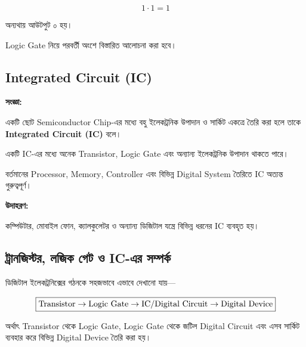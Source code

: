 \[
1\cdot1=1
\]

অন্যথায় আউটপুট ০ হয়।

\par\begingroup

\textenglish{Logic Gate} নিয়ে পরবর্তী অংশে বিস্তারিত আলোচনা করা হবে।
\par\endgroup



\subsection{\textenglish{Integrated Circuit (IC)}}

\par\begingroup

\textbf{সংজ্ঞা:}

একটি ছোট \textenglish{Semiconductor Chip}-এর মধ্যে
বহু ইলেকট্রনিক উপাদান ও সার্কিট একত্রে তৈরি করা হলে
তাকে \textbf{\textenglish{Integrated Circuit (IC)}} বলে।
\par\endgroup


একটি \textenglish{IC}-এর মধ্যে অনেক
\textenglish{Transistor}, \textenglish{Logic Gate}
এবং অন্যান্য ইলেকট্রনিক উপাদান থাকতে পারে।

বর্তমানের \textenglish{Processor}, \textenglish{Memory},
\textenglish{Controller} এবং বিভিন্ন
\textenglish{Digital System} তৈরিতে
\textenglish{IC} অত্যন্ত গুরুত্বপূর্ণ।

\textbf{\textcolor{ICTOrange}{উদাহরণ:}}

কম্পিউটার, মোবাইল ফোন, ক্যালকুলেটর ও অন্যান্য
ডিজিটাল যন্ত্রে বিভিন্ন ধরনের \textenglish{IC} ব্যবহৃত হয়।


\subsection{ট্রানজিস্টর, লজিক গেট ও \textenglish{IC}-এর সম্পর্ক}

ডিজিটাল ইলেকট্রনিক্সের গঠনকে সহজভাবে এভাবে দেখানো যায়—

\[
\boxed{
\text{\textenglish{Transistor}}
\rightarrow
\text{\textenglish{Logic Gate}}
\rightarrow
\text{\textenglish{IC/Digital Circuit}}
\rightarrow
\text{\textenglish{Digital Device}}
}
\]

অর্থাৎ \textenglish{Transistor} থেকে
\textenglish{Logic Gate},
\textenglish{Logic Gate} থেকে জটিল
\textenglish{Digital Circuit}
এবং এসব সার্কিট ব্যবহার করে বিভিন্ন
\textenglish{Digital Device} তৈরি করা হয়।

